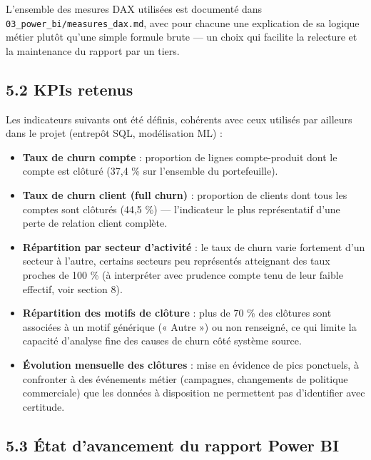 \documentclass[11pt,a4paper]{article}
\providecommand{\tightlist}{\setlength{\itemsep}{0pt}\setlength{\parskip}{0pt}}
\begin{document}
L'ensemble des mesures DAX utilisées est documenté dans
\texttt{03\_\hspace{0pt}power\_\hspace{0pt}bi/\hspace{0pt}measures\_\hspace{0pt}dax.md},
avec pour chacune une explication de sa logique métier plutôt qu'une
simple formule brute --- un choix qui facilite la relecture et la
maintenance du rapport par un tiers.

\hypertarget{kpis-retenus}{%
\subsection{5.2 KPIs retenus}\label{kpis-retenus}}

Les indicateurs suivants ont été définis, cohérents avec ceux utilisés
par ailleurs dans le projet (entrepôt SQL, modélisation ML) :

\begin{itemize}
\tightlist
\item
  \textbf{Taux de churn compte} : proportion de lignes compte-produit
  dont le compte est clôturé (37,4 \% sur l'ensemble du portefeuille).
\item
  \textbf{Taux de churn client (full churn)} : proportion de clients
  dont tous les comptes sont clôturés (44,5 \%) --- l'indicateur le plus
  représentatif d'une perte de relation client complète.
\item
  \textbf{Répartition par secteur d'activité} : le taux de churn varie
  fortement d'un secteur à l'autre, certains secteurs peu représentés
  atteignant des taux proches de 100 \% (à interpréter avec prudence
  compte tenu de leur faible effectif, voir section 8).
\item
  \textbf{Répartition des motifs de clôture} : plus de 70 \% des
  clôtures sont associées à un motif générique (« Autre ») ou non
  renseigné, ce qui limite la capacité d'analyse fine des causes de
  churn côté système source.
\item
  \textbf{Évolution mensuelle des clôtures} : mise en évidence de pics
  ponctuels, à confronter à des événements métier (campagnes,
  changements de politique commerciale) que les données à disposition ne
  permettent pas d'identifier avec certitude.
\end{itemize}

\hypertarget{uxe9tat-davancement-du-rapport-power-bi}{%
\subsection{5.3 État d'avancement du rapport Power
BI}\label{uxe9tat-davancement-du-rapport-power-bi}}
\end{document}
